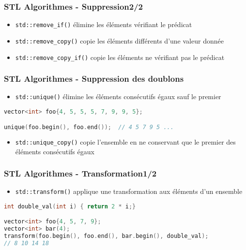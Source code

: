 \documentclass[C++.tex]{subfiles}
\begin{document}
\begin{frame}[fragile]
	\frametitle{STL Algorithmes - Suppression\titlehfill{}2/2}
	\begin{itemize}
		\item \lstinline|std::remove_if()| \og élimine\fg{} les éléments vérifiant le prédicat
		\item \lstinline|std::remove_copy()| copie les éléments différents d'une valeur donnée
		\item \lstinline|std::remove_copy_if()| copie les éléments ne vérifiant pas le prédicat
	\end{itemize}
\end{frame}

\begin{frame}[fragile]
	\frametitle{STL Algorithmes - Suppression des doublons}
	\begin{itemize}
		\item \lstinline|std::unique()| \og élimine\fg{} les éléments consécutifs égaux sauf le premier
	\end{itemize}


	\begin{lstlisting}[language=C++]
vector<int> foo{4, 5, 5, 5, 7, 9, 9, 5};

unique(foo.begin(), foo.end());  // 4 5 7 9 5 ... \end{lstlisting}

	\begin{itemize}
		\item \lstinline|std::unique_copy()| copie l'ensemble en ne conservant que le premier des éléments consécutifs égaux
	\end{itemize}
\end{frame}

\begin{frame}[fragile]
	\frametitle{STL Algorithmes - Transformation\titlehfill{}1/2}
	\begin{itemize}
		\item \lstinline|std::transform()| applique une transformation aux éléments d'un ensemble
	\end{itemize}

	\begin{lstlisting}[language=C++]
int double_val(int i) { return 2 * i;}

vector<int> foo{4, 5, 7, 9};
vector<int> bar(4);
transform(foo.begin(), foo.end(), bar.begin(), double_val);
// 8 10 14 18\end{lstlisting}
\end{frame}
\end{document}
